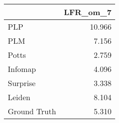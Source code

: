 \begin{tabular}{lr}
\toprule
{} & LFR_om_7 \\
\midrule
PLP          &   10.966 \\
PLM          &    7.156 \\
Potts        &    2.759 \\
Infomap      &    4.096 \\
Surprise     &    3.338 \\
Leiden       &    8.104 \\
Ground Truth &    5.310 \\
\bottomrule
\end{tabular}
